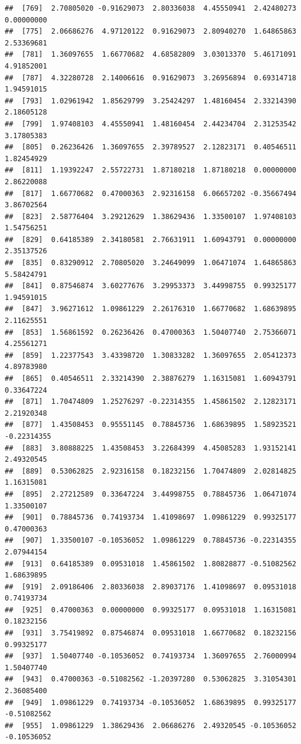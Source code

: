 \documentclass[
]{article}
\begin{document}
\begin{verbatim}
##  [769]  2.70805020 -0.91629073  2.80336038  4.45550941  2.42480273  0.00000000
##  [775]  2.06686276  4.97120122  0.91629073  2.80940270  1.64865863  2.53369681
##  [781]  1.36097655  1.66770682  4.68582809  3.03013370  5.46171091  4.91852001
##  [787]  4.32280728  2.14006616  0.91629073  3.26956894  0.69314718  1.94591015
##  [793]  1.02961942  1.85629799  3.25424297  1.48160454  2.33214390  2.18605128
##  [799]  1.97408103  4.45550941  1.48160454  2.44234704  2.31253542  3.17805383
##  [805]  0.26236426  1.36097655  2.39789527  2.12823171  0.40546511  1.82454929
##  [811]  1.19392247  2.55722731  1.87180218  1.87180218  0.00000000  2.86220088
##  [817]  1.66770682  0.47000363  2.92316158  6.06657202 -0.35667494  3.86702564
##  [823]  2.58776404  3.29212629  1.38629436  1.33500107  1.97408103  1.54756251
##  [829]  0.64185389  2.34180581  2.76631911  1.60943791  0.00000000  2.35137526
##  [835]  0.83290912  2.70805020  3.24649099  1.06471074  1.64865863  5.58424791
##  [841]  0.87546874  3.60277676  3.29953373  3.44998755  0.99325177  1.94591015
##  [847]  3.96271612  1.09861229  2.26176310  1.66770682  1.68639895  2.11625551
##  [853]  1.56861592  0.26236426  0.47000363  1.50407740  2.75366071  4.25561271
##  [859]  1.22377543  3.43398720  1.30833282  1.36097655  2.05412373  4.89783980
##  [865]  0.40546511  2.33214390  2.38876279  1.16315081  1.60943791  0.33647224
##  [871]  1.70474809  1.25276297 -0.22314355  1.45861502  2.12823171  2.21920348
##  [877]  1.43508453  0.95551145  0.78845736  1.68639895  1.58923521 -0.22314355
##  [883]  3.80888225  1.43508453  3.22684399  4.45085283  1.93152141  2.49320545
##  [889]  0.53062825  2.92316158  0.18232156  1.70474809  2.02814825  1.16315081
##  [895]  2.27212589  0.33647224  3.44998755  0.78845736  1.06471074  1.33500107
##  [901]  0.78845736  0.74193734  1.41098697  1.09861229  0.99325177  0.47000363
##  [907]  1.33500107 -0.10536052  1.09861229  0.78845736 -0.22314355  2.07944154
##  [913]  0.64185389  0.09531018  1.45861502  1.80828877 -0.51082562  1.68639895
##  [919]  2.09186406  2.80336038  2.89037176  1.41098697  0.09531018  0.74193734
##  [925]  0.47000363  0.00000000  0.99325177  0.09531018  1.16315081  0.18232156
##  [931]  3.75419892  0.87546874  0.09531018  1.66770682  0.18232156  0.99325177
##  [937]  1.50407740 -0.10536052  0.74193734  1.36097655  2.76000994  1.50407740
##  [943]  0.47000363 -0.51082562 -1.20397280  0.53062825  3.31054301  2.36085400
##  [949]  1.09861229  0.74193734 -0.10536052  1.68639895  0.99325177 -0.51082562
##  [955]  1.09861229  1.38629436  2.06686276  2.49320545 -0.10536052 -0.10536052

\end{verbatim}
\end{document}

